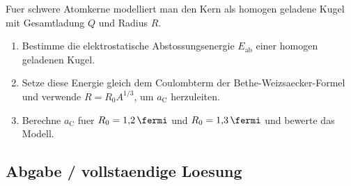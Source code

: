 \documentclass[11pt,a4paper]{scrartcl}
\theoremstyle{definition}
\theoremstyle{plain}
\theoremstyle{remark}
\newcommand{\Eab}{E_{\mathrm{ab}}}
\newcommand{\aC}{a_{\mathrm C}}
\begin{document}
\begin{taskbox}
Fuer schwere Atomkerne modelliert man den Kern als homogen geladene Kugel mit Gesamtladung $Q$ und Radius $R$.
\begin{enumerate}[label=(\alph*)]
    \item Bestimme die elektrostatische Abstossungsenergie $\Eab$ einer homogen geladenen Kugel.
    \item Setze diese Energie gleich dem Coulombterm der Bethe-Weizsaecker-Formel und verwende $R=R_0A^{1/3}$, um $\aC$ herzuleiten.
    \item Berechne $\aC$ fuer $R_0=\SI{1.2}{\fermi}$ und $R_0=\SI{1.3}{\fermi}$ und bewerte das Modell.
\end{enumerate}
\end{taskbox}

\subsection{Abgabe / vollstaendige Loesung}
\end{document}
